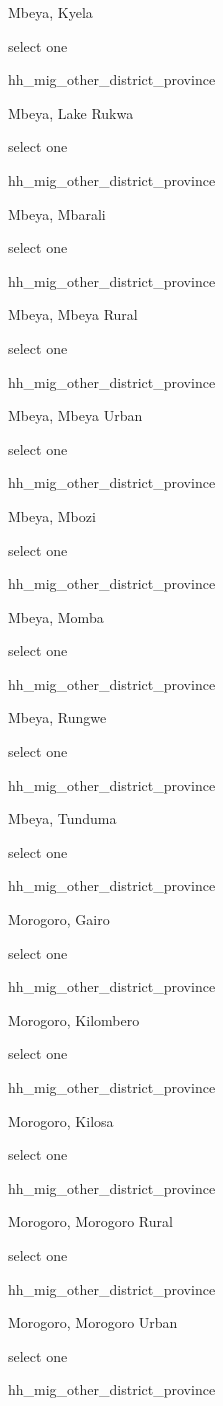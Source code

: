 \documentclass[]{article}
\begin{document}
Mbeya, Kyela

select one

hh\_mig\_other\_district\_province

Mbeya, Lake Rukwa

select one

hh\_mig\_other\_district\_province

Mbeya, Mbarali

select one

hh\_mig\_other\_district\_province

Mbeya, Mbeya Rural

select one

hh\_mig\_other\_district\_province

Mbeya, Mbeya Urban

select one

hh\_mig\_other\_district\_province

Mbeya, Mbozi

select one

hh\_mig\_other\_district\_province

Mbeya, Momba

select one

hh\_mig\_other\_district\_province

Mbeya, Rungwe

select one

hh\_mig\_other\_district\_province

Mbeya, Tunduma

select one

hh\_mig\_other\_district\_province

Morogoro, Gairo

select one

hh\_mig\_other\_district\_province

Morogoro, Kilombero

select one

hh\_mig\_other\_district\_province

Morogoro, Kilosa

select one

hh\_mig\_other\_district\_province

Morogoro, Morogoro Rural

select one

hh\_mig\_other\_district\_province

Morogoro, Morogoro Urban

select one

hh\_mig\_other\_district\_province
\end{document}
